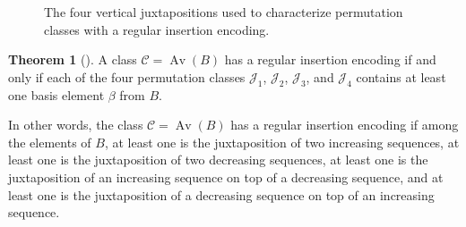 \documentclass[11pt]{article}
\theoremstyle{definition}
\newtheorem{theorem}{Theorem}
\numberwithin{theorem}{section}
\numberwithin{question}{section}
\numberwithin{definition}{section}
\numberwithin{example}{section}
\numberwithin{remark}{section}
\newcommand{\Av}{\operatorname{Av}}
\newcommand{\CC}{\mathcal{C}}
\newcommand{\JJ}{\mathcal{J}}
\begin{document}
\begin{figure}
	\begin{center}
		\qquad
		\qquad
		\qquad
	\end{center}
	\caption{The four vertical juxtapositions used to characterize permutation classes with a regular insertion encoding.}
	\label{figure:juxta}
\end{figure}
\begin{theorem}[{\cite[Proposition 13]{albert:insertion-encoding}}]
	\label{theorem:rie-condition}
	A class $\CC = \Av(B)$ has a regular insertion encoding if and only if each of the four permutation classes $\JJ_1$, $\JJ_2$, $\JJ_3$, and $\JJ_4$ contains at least one basis element $\beta$ from $B$.
\end{theorem}

In other words, the class $\CC = \Av(B)$ has a regular insertion encoding if among the elements of $B$, at least one is the juxtaposition of two increasing sequences, at least one is the juxtaposition of two decreasing sequences, at least one is the juxtaposition of an increasing sequence on top of a decreasing sequence, and at least one is the juxtaposition of a decreasing sequence on top of an increasing sequence.
\end{document}
